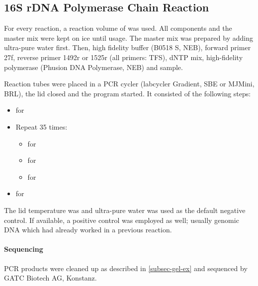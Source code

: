 \subsection{16S rDNA Polymerase Chain Reaction\label{subsec-met-16s-pcr}}
For every reaction, a reaction volume of  was used. All components and the master mix were kept on ice until usage. The master mix was prepared by adding ultra-pure water first. Then,  high fidelity buffer (B0518 S, NEB),   forward primer 27f,   reverse primer 1492r or 1525r (all primers: TFS),   dNTP mix,  high-fidelity polymerase (Phusion DNA Polymerase, NEB) and  sample.

Reaction tubes were placed in a PCR cycler (labcycler Gradient, SBE or MJMini, BRL), the lid closed and the program started. It consisted of the following steps:
\begin{itemize}
	\item {} for 
	\item Repeat 35 times:
	\begin{itemize}
		\item {} for 
		\item {} for 
		\item {} for 
	\end{itemize}
	\item {} for 
\end{itemize}
The lid temperature was  and ultra-pure water was used as the default negative control. If available, a positive control was employed as well; usually genomic DNA which had already worked in a previous reaction.

\paragraph{Sequencing}
PCR products were cleaned up as described in \vref{subsec-gel-ex} and sequenced by GATC Biotech AG, Konstanz.

